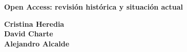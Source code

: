 \documentclass[a0,portrait]{a0poster}
\begin{document}


\begin{minipage}[b]{1\linewidth}
  \VeryHuge \color{openaccess} \textbf{Open Access: revisión histórica y situación actual} \color{Black}\\ %

  \vspace{1cm} %

  \huge \textbf{Cristina Heredia}\\[0.6cm] %
  \huge \textbf{David Charte}\\[0.5cm] %
  \huge \textbf{Alejandro Alcalde} \\[0.5cm] %
\end{minipage}
%
\begin{minipage}[b]{0.25\linewidth}
\end{minipage}

\vspace{1cm} %

\end{document}
